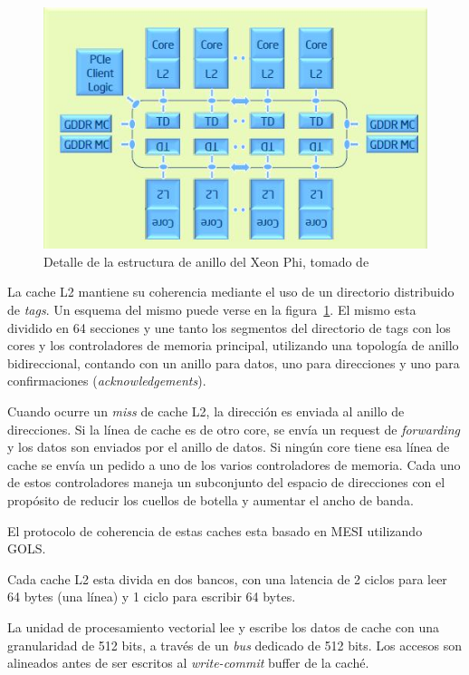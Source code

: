 \begin{figure}[htbp]
   \centering
   \includegraphics[width=\plotwidth]{images/xeon-phi-ring.jpg}
   \caption{Detalle de la estructura de anillo del Xeon Phi, tomado de~\cite{XeonPhiArchArticle}}
   \label{fig::xeon_phi_arch_global}
\end{figure}

La cache L2 mantiene su coherencia mediante el uso de un directorio distribuido de \textit{tags}. Un esquema del mismo puede
verse en la figura~\ref{fig::xeon_phi_arch_global}. El mismo esta dividido en 64 secciones y une tanto los segmentos del
directorio de tags con los cores y los controladores de memoria principal, utilizando una topolog\'ia de anillo bidireccional,
contando con un anillo para datos, uno para direcciones y uno para confirmaciones (\textit{acknowledgements}).

Cuando ocurre un \textit{miss} de cache L2, la direcci\'on es enviada al anillo de direcciones. Si la l\'inea de cache
es de otro core, se env\'ia un request de \textit{forwarding} y los datos son enviados por el anillo de datos. Si ning\'un
core tiene esa l\'inea de cache se env\'ia un pedido a uno de los varios controladores de memoria. Cada uno de estos controladores
maneja un subconjunto del espacio de direcciones con el prop\'osito de reducir los cuellos de botella y aumentar el ancho de banda.

El protocolo de coherencia de estas caches esta basado en MESI utilizando GOLS.

Cada cache L2 esta divida en dos bancos, con una latencia de 2 ciclos para leer 64 bytes (una l\'inea) y 1 ciclo para escribir 64 bytes.

La unidad de procesamiento vectorial lee y escribe los datos de cache con una granularidad de 512 bits, a trav\'es de un
\textit{bus} dedicado de 512 bits. Los accesos son alineados antes de ser escritos al \textit{write-commit} buffer de la
cach\'e.

